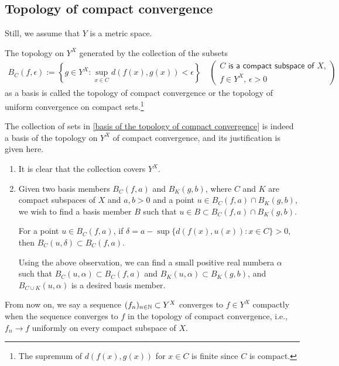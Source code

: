 \subsection{Topology of compact convergence}
Still, we assume that $Y$ is a metric space.
\begin{defi}
    The topology on $Y^X$ generated by the collection of the subsets
    \begin{align}\label{basis of the topology of compact convergence}
        B_C(f, \epsilon):=\left\{g\in Y^X: \sup_{x\in C} d(f(x), g(x))<\epsilon\right\}\quad
        \begin{pmatrix}
            \textsf{$C$ is a compact subspace of $X$,}\\
            f\in Y^X,\, \epsilon>0
        \end{pmatrix}
    \end{align}
    as a basis is called the topology of compact convergence or the topology of uniform convergence on compact sets.\footnote{The supremum of $d(f(x), g(x))$ for $x\in C$ is finite since $C$ is compact.}
\end{defi}
\begin{rmk}
    The collection of sets in \cref{basis of the topology of compact convergence} is indeed a basis of the topology on $Y^X$ of compact convergence, and its justification is given here.
    \begin{enumerate}
        \item[(1)]
        {
            It is clear that the collection covers $Y^X$.
        }
        \item[(2)]
        {
            Given two basis members $B_C(f, a)$ and $B_K(g, b)$, where $C$ and $K$ are compact subspaces of $X$ and $a, b>0$ and a point $u\in B_C(f, a)\cap B_K(g, b)$, we wish to find a basis member $B$ such that $u\in B\subset B_C(f, a)\cap B_K(g, b)$.
            \begin{center}
                For a point $u\in B_C(f, a)$, if $\delta=a-\sup\{d(f(x), u(x)): x\in C\}>0$, then $B_C(u, \delta)\subset B_C(f, a)$.
            \end{center}
            Using the above observation, we can find a small positive real numbera $\alpha$ such that $B_C(u, \alpha)\subset B_C(f, a)$ and $B_K(u, \alpha)\subset B_K(g, b)$, and $B_{C\cup K}(u, \alpha)$ is a desired basis member.
        }
    \end{enumerate}
\end{rmk}
From now on, we say a sequence $(f_n)_{n\in{\mathbb{N}}}\subset Y^X$ converges to $f\in Y^X$ compactly when the sequence converges to $f$ in the topology of compact convergence, i.e., $f_n\rightarrow f$ uniformly on every compact subspace of $X$.

